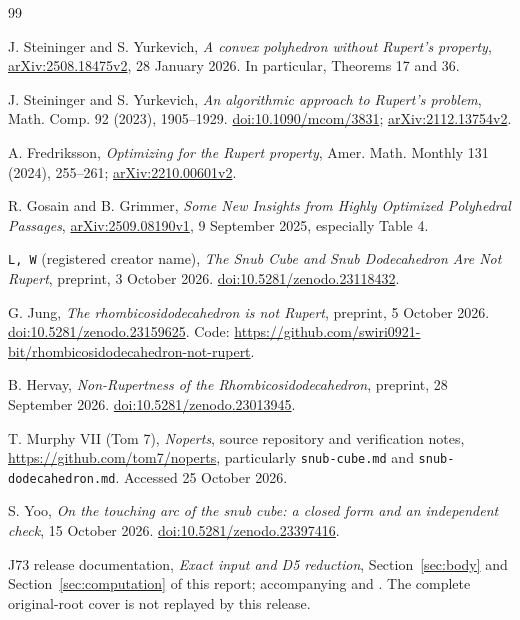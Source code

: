 \begin{thebibliography}{99}
\raggedright
{} J. Steininger and S. Yurkevich,
\emph{A convex polyhedron without Rupert's property},
\href{https://arxiv.org/abs/2508.18475v2}{arXiv:2508.18475v2},
28 January 2026. In particular, Theorems 17 and 36.

 J. Steininger and S. Yurkevich,
\emph{An algorithmic approach to Rupert's problem},
Math. Comp. 92 (2023), 1905--1929.
\href{https://doi.org/10.1090/mcom/3831}{doi:10.1090/mcom/3831};
\href{https://arxiv.org/abs/2112.13754v2}{arXiv:2112.13754v2}.

 A. Fredriksson,
\emph{Optimizing for the Rupert property},
Amer. Math. Monthly 131 (2024), 255--261;
\href{https://arxiv.org/abs/2210.00601v2}{arXiv:2210.00601v2}.

 R. Gosain and B. Grimmer,
\emph{Some New Insights from Highly Optimized Polyhedral Passages},
\href{https://arxiv.org/abs/2509.08190v1}{arXiv:2509.08190v1},
9 September 2025, especially Table 4.

 \texttt{L, W} (registered creator name),
\emph{The Snub Cube and Snub Dodecahedron Are Not Rupert},
preprint, 3 October 2026.
\href{https://doi.org/10.5281/zenodo.23118432}{doi:10.5281/zenodo.23118432}.

 G. Jung,
\emph{The rhombicosidodecahedron is not Rupert},
preprint, 5 October 2026.
\href{https://doi.org/10.5281/zenodo.23159625}{doi:10.5281/zenodo.23159625}.
Code: \url{https://github.com/swiri0921-bit/rhombicosidodecahedron-not-rupert}.

 B. Hervay,
\emph{Non-Rupertness of the Rhombicosidodecahedron},
preprint, 28 September 2026.
\href{https://doi.org/10.5281/zenodo.23013945}{doi:10.5281/zenodo.23013945}.

 T. Murphy VII (Tom 7),
\emph{Noperts}, source repository and verification notes,
\url{https://github.com/tom7/noperts}, particularly
\texttt{snub-cube.md} and \texttt{snub-dodecahedron.md}.
Accessed 25 October 2026.

 S. Yoo,
\emph{On the touching arc of the snub cube: a closed form and an
independent check}, 15 October 2026.
\href{https://doi.org/10.5281/zenodo.23397416}{doi:10.5281/zenodo.23397416}.

 J73 release documentation,
\emph{Exact input and D5 reduction}, Section~\ref{sec:body} and
Section~\ref{sec:computation} of this report; accompanying
 and
.
The complete original-root cover is not replayed by this release.


\end{thebibliography}
